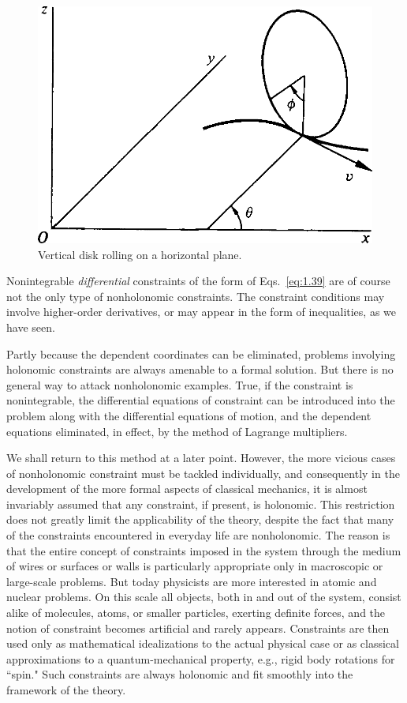 \begin{figure}[htbp]
    \centering
    \includegraphics[scale = 0.225]{01/figures/1.5}
    \caption{Vertical disk rolling on a horizontal plane.}
    \label{fig:1.5}
\end{figure}

Nonintegrable \emph{differential} constraints of the form of Eqs.~\eqref{eq:1.39} are of course not the only type of nonholonomic constraints. The constraint conditions may involve higher-order derivatives, or may appear in the form of inequalities, as we have seen.

Partly because the dependent coordinates can be eliminated, problems involying holonomic constraints are always amenable to a formal solution. But there is no general way to attack nonholonomic examples. True, if the constraint is nonintegrable, the differential equations of constraint can be introduced into the problem along with the differential equations of motion, and the dependent equations eliminated, in effect, by the method of Lagrange multipliers.

We shall return to this method at a later point. However, the more vicious cases of nonholonomic constraint must be tackled individually, and consequently in the development of the more formal aspects of classical mechanics, it is almost invariably assumed that any constraint, if present, is holonomic. This restriction does not greatly limit the applicability of the theory, despite the fact that many of the constraints encountered in everyday life are nonholonomic. The reason is that the entire concept of constraints imposed in the system through the medium of wires or surfaces or walls is particularly appropriate only in macroscopic or large-scale problems. But today physicists are more interested in atomic and nuclear problems. On this scale all objects, both in and out of the system, consist alike of molecules, atoms, or smaller particles, exerting definite forces, and the notion of constraint becomes artificial and rarely appears. Constraints are then used only as mathematical idealizations to the actual physical case or as classical approximations to a quantum-mechanical property, e.g., rigid body rotations for ``spin." Such constraints are always holonomic and fit smoothly into the framework of the theory.

